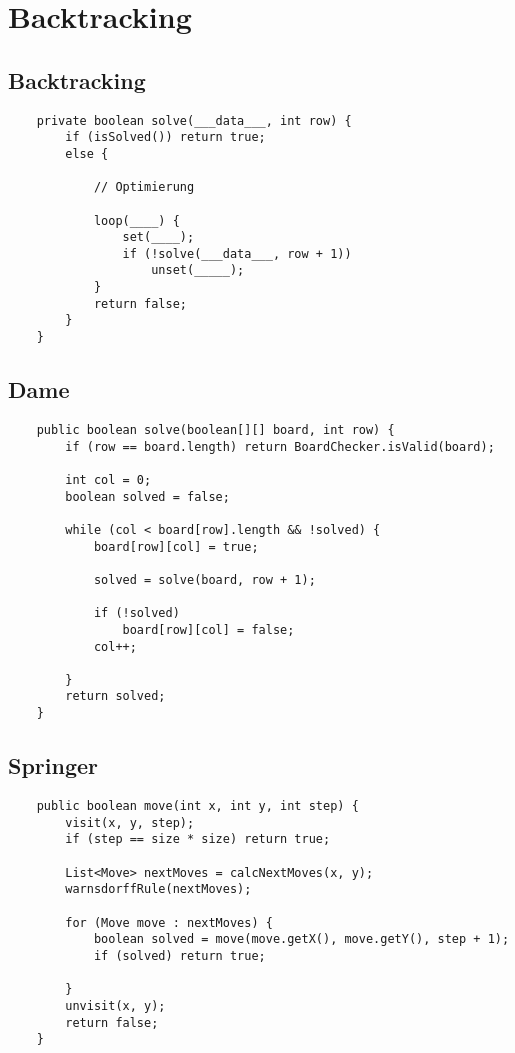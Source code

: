 \section*{Backtracking}
\subsection*{Backtracking}
\begin{verbatim}
	private boolean solve(___data___, int row) {
        if (isSolved()) return true;
        else {

            // Optimierung

            loop(____) {
                set(____);
                if (!solve(___data___, row + 1))
                    unset(_____);
            }
            return false;
        }
    }
\end{verbatim}
\subsection*{Dame}
\begin{verbatim}
    public boolean solve(boolean[][] board, int row) {
        if (row == board.length) return BoardChecker.isValid(board);

        int col = 0;
        boolean solved = false;

        while (col < board[row].length && !solved) {
            board[row][col] = true;

            solved = solve(board, row + 1);

            if (!solved)
                board[row][col] = false;
            col++;

        }
        return solved;
    }
\end{verbatim}
\subsection*{Springer}
\begin{verbatim}
    public boolean move(int x, int y, int step) {
        visit(x, y, step);
        if (step == size * size) return true;

        List<Move> nextMoves = calcNextMoves(x, y);
        warnsdorffRule(nextMoves);

        for (Move move : nextMoves) {
            boolean solved = move(move.getX(), move.getY(), step + 1);
            if (solved) return true;

        }
        unvisit(x, y);
        return false;
    }
\end{verbatim}
